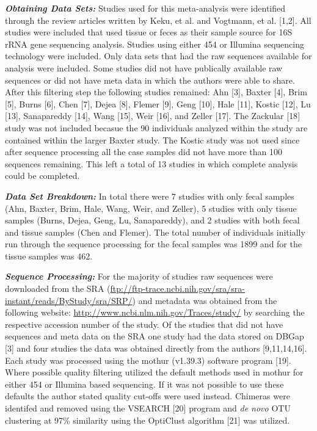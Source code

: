 \documentclass[12pt,]{article}
\begin{document}
\textbf{\emph{Obtaining Data Sets:}} Studies used for this meta-analysis
were identified through the review articles written by Keku, et al. and
Vogtmann, et al. {[}1,2{]}. All studies were included that used tissue
or feces as their sample source for 16S rRNA gene sequencing analysis.
Studies using either 454 or Illumina sequencing technology were
included. Only data sets that had the raw sequences available for
analysis were included. Some studies did not have publically available
raw sequences or did not have meta data in which the authors were able
to share. After this filtering step the following studies remained: Ahn
{[}3{]}, Baxter {[}4{]}, Brim {[}5{]}, Burns {[}6{]}, Chen {[}7{]},
Dejea {[}8{]}, Flemer {[}9{]}, Geng {[}10{]}, Hale {[}11{]}, Kostic
{[}12{]}, Lu {[}13{]}, Sanapareddy {[}14{]}, Wang {[}15{]}, Weir
{[}16{]}, and Zeller {[}17{]}. The Zackular {[}18{]} study was not
included becasue the 90 individuals analyzed within the study are
contained within the larger Baxter study. The Kostic study was not used
since after sequence processing all the case samples did not have more
than 100 sequences remaining. This left a total of 13 studies in which
complete analysis could be completed.

\textbf{\emph{Data Set Breakdown:}} In total there were 7 studies with
only fecal samples (Ahn, Baxter, Brim, Hale, Wang, Weir, and Zeller), 5
studies with only tissue samples (Burns, Dejea, Geng, Lu, Sanapareddy),
and 2 studies with both fecal and tissue samples (Chen and Flemer). The
total number of individuals initially run through the sequence
processing for the fecal samples was 1899 and for the tissue samples was
462.

\textbf{\emph{Sequence Processing:}} For the majority of studies raw
sequences were downloaded from the SRA
(\url{ftp://ftp-trace.ncbi.nih.gov/sra/sra-instant/reads/ByStudy/sra/SRP/})
and metadata was obtained from the following website:
\url{http://www.ncbi.nlm.nih.gov/Traces/study/} by searching the
respective accession number of the study. Of the studies that did not
have sequences and meta data on the SRA one study had the data stored on
DBGap {[}3{]} and four studies the data was obtained directly from the
authors {[}9,11,14,16{]}. Each study was processed using the mothur
(v1.39.3) software program {[}19{]}. Where possible quality filtering
utilized the default methods used in mothur for either 454 or Illumina
based sequencing. If it was not possible to use these defaults the
author stated quality cut-offs were used instead. Chimeras were
identifed and removed using the VSEARCH {[}20{]} program and \emph{de
novo} OTU clustering at 97\% similarity using the OptiClust algorithm
{[}21{]} was utilized.
\end{document}

